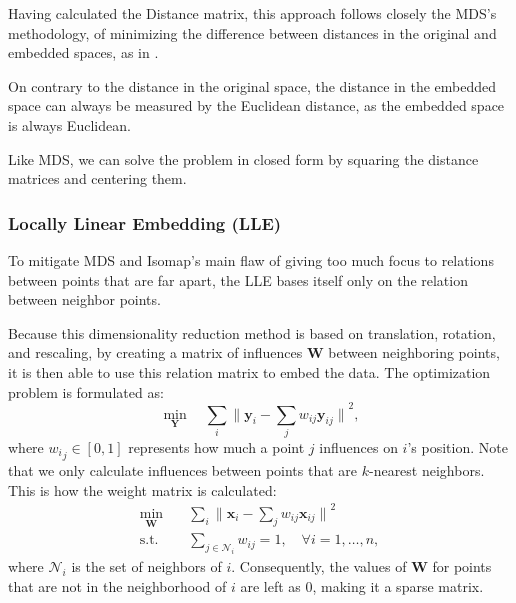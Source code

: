             Having calculated the Distance matrix, this approach follows closely the \ac{MDS}'s methodology, of minimizing the difference between distances in the original and embedded spaces, as in .

            On contrary to the distance in the original space, the distance in the embedded space can always be measured by the Euclidean distance, as the embedded space is always Euclidean.
            
            Like MDS, we can solve the problem in closed form by squaring the distance matrices and centering them.

        \subsubsection{Locally Linear Embedding (LLE)}
            To mitigate MDS and \ac{Isomap}'s main flaw of giving too much focus to relations between points that are far apart, the \ac{LLE} \cite{lle} bases itself only on the relation between neighbor points.

            Because this dimensionality reduction method is based on translation, rotation, and rescaling, by creating a matrix of influences $\boldsymbol{W}$ between neighboring points, it is then able to use this relation matrix to embed the data. The optimization problem is formulated as:
            \begin{equation}
                \min_{\boldsymbol{Y}} \quad \sum_i {\| \boldsymbol{y}_i - \sum_j w_{ij} \boldsymbol{y}_{ij} \|}^2,
                \label{form:LLE}
            \end{equation}
            where ${w_i}_j \in [0,1]$ represents how much a point $j$ influences on $i$'s position. Note that we only calculate influences between points that are $k$-nearest neighbors. This is how the weight matrix is calculated:
            \begin{align}
                \min_{\boldsymbol{W}} \quad &
                \sum_i {\| \boldsymbol{x}_i - \sum_j w_{ij} \boldsymbol{x}_{ij} \|}^2 \\
                \textrm{s.t.} \quad 
                    & \sum_{j\in\mathcal{N}_i} w_{ij} = 1,\quad\forall i=1,\dotsc,n,
                \label{eq:lle-weights}
            \end{align}
            where $\mathcal{N}_i$ is the set of neighbors of $i$. Consequently, the values of $\boldsymbol{W}$ for points that are not in the neighborhood of $i$ are left as 0, making it a sparse matrix.
            
